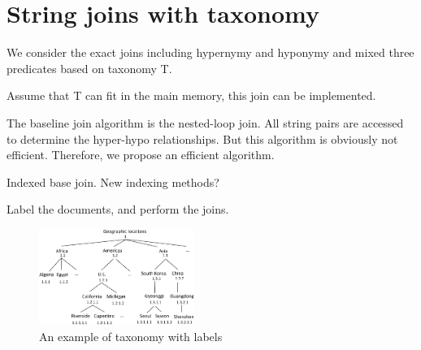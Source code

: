 \documentclass{sig-alternate}
\begin{document}
\section{String joins with taxonomy}

We consider the exact joins including hypernymy and hyponymy and mixed three predicates based on taxonomy T.

Assume that T can fit in the main memory, this join can be implemented.

The baseline join algorithm is the nested-loop join. All string pairs are accessed to determine the hyper-hypo relationships. But this algorithm is obviously not efficient. Therefore, we propose an efficient algorithm.


Indexed base join. New indexing methods?

Label the documents, and perform the joins.

\begin{figure}[t]
\centering
\includegraphics[width=0.45\textwidth]{figures/taxonomylabels}
 \caption{An example of taxonomy with labels}
\label{fig:taxonomy}
\end{figure}
\end{document}
